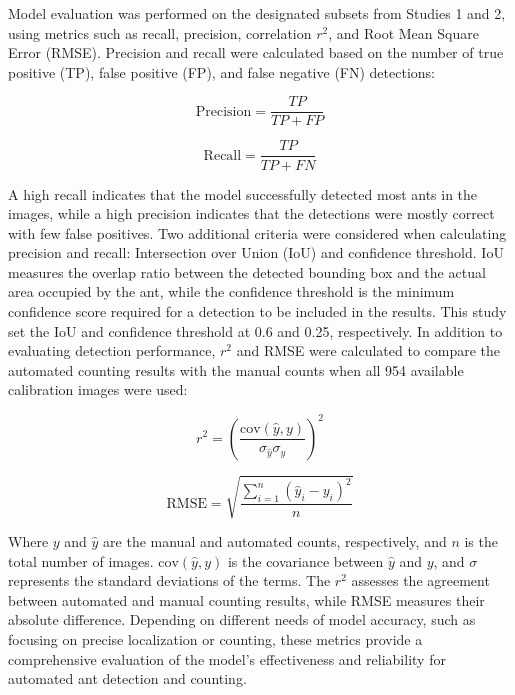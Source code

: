 Model evaluation was performed on the designated subsets from Studies 1 and 2, using metrics such as recall, precision, correlation $r^2$, and Root Mean Square Error (RMSE). Precision and recall were calculated based on the number of true positive (TP), false positive (FP), and false negative (FN) detections:

\begin{equation}
\text{Precision} = \frac{TP}{TP + FP}
\end{equation}

\begin{equation}
\text{Recall} = \frac{TP}{TP + FN}
\end{equation}

A high recall indicates that the model successfully detected most ants in the images, while a high precision indicates that the detections were mostly correct with few false positives. Two additional criteria were considered when calculating precision and recall: Intersection over Union (IoU) and confidence threshold. IoU measures the overlap ratio between the detected bounding box and the actual area occupied by the ant, while the confidence threshold is the minimum confidence score required for a detection to be included in the results. This study set the IoU and confidence threshold at 0.6 and 0.25, respectively. In addition to evaluating detection performance, $r^2$ and RMSE were calculated to compare the automated counting results with the manual counts when all 954 available calibration images were used:

\begin{equation}
r^2 = \left( \frac{\text{cov}(\hat{y}, y)}{\sigma_{\hat{y}} \sigma_y} \right)^2
\end{equation}

\begin{equation}
\text{RMSE} = \sqrt{ \frac{ \sum_{i=1}^{n} (\hat{y}_i - y_i)^2 }{ n } }
\end{equation}

Where $y$ and $\hat{y}$ are the manual and automated counts, respectively, and $n$ is the total number of images. $\text{cov}(\hat{y}, y)$ is the covariance between $\hat{y}$ and $y$, and $\sigma$ represents the standard deviations of the terms. The $r^2$ assesses the agreement between automated and manual counting results, while RMSE measures their absolute difference. Depending on different needs of model accuracy, such as focusing on precise localization or counting, these metrics provide a comprehensive evaluation of the model’s effectiveness and reliability for automated ant detection and counting.

